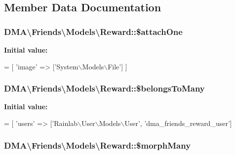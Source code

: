 \subsection{Member Data Documentation}
\hypertarget{classDMA_1_1Friends_1_1Models_1_1Reward_ab1843b31c74161b3adcb02c7be7e9556}{
\subsubsection[{\$attach\-One}]{\setlength{\rightskip}{0pt plus 5cm}D\-M\-A\textbackslash{}\-Friends\textbackslash{}\-Models\textbackslash{}\-Reward\-::\$attach\-One}}\label{classDMA_1_1Friends_1_1Models_1_1Reward_ab1843b31c74161b3adcb02c7be7e9556}
{\bfseries Initial value\-:}
\begin{DoxyCode}
= [
        \textcolor{stringliteral}{'image'} => [\textcolor{stringliteral}{'System\(\backslash\)Models\(\backslash\)File'}]
    ]
\end{DoxyCode}
\hypertarget{classDMA_1_1Friends_1_1Models_1_1Reward_a4562d55136961af6257eac8242bc77a1}{
\subsubsection[{\$belongs\-To\-Many}]{\setlength{\rightskip}{0pt plus 5cm}D\-M\-A\textbackslash{}\-Friends\textbackslash{}\-Models\textbackslash{}\-Reward\-::\$belongs\-To\-Many}}\label{classDMA_1_1Friends_1_1Models_1_1Reward_a4562d55136961af6257eac8242bc77a1}
{\bfseries Initial value\-:}
\begin{DoxyCode}
= [
        \textcolor{stringliteral}{'users'} => [\textcolor{stringliteral}{'Rainlab\(\backslash\)User\(\backslash\)Models\(\backslash\)User'}, \textcolor{stringliteral}{'dma\_friends\_reward\_user'}]
\end{DoxyCode}
\hypertarget{classDMA_1_1Friends_1_1Models_1_1Reward_a471e1042553519781408b0ebe6133397}{
\subsubsection[{\$morph\-Many}]{\setlength{\rightskip}{0pt plus 5cm}D\-M\-A\textbackslash{}\-Friends\textbackslash{}\-Models\textbackslash{}\-Reward\-::\$morph\-Many}}\label{classDMA_1_1Friends_1_1Models_1_1Reward_a471e1042553519781408b0ebe6133397}
